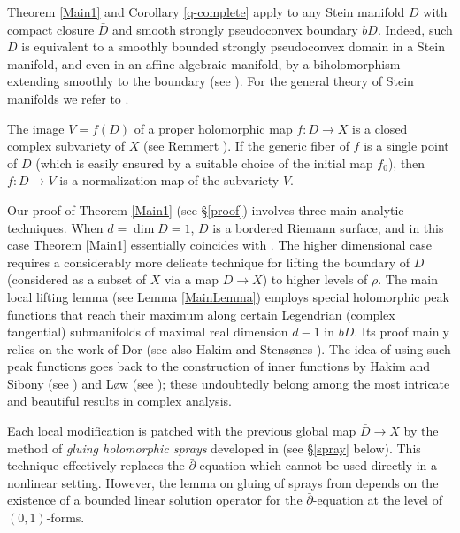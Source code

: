 \documentclass[11pt]{amsart}
\numberwithin{equation}{section}
\theoremstyle{definition}
\begin{document}
Theorem \ref{Main1} and Corollary \ref{q-complete} 
apply to any Stein manifold $D$ 
with compact closure $\bar D$ and smooth strongly 
pseudoconvex boundary $bD$. Indeed, such $D$ is equivalent to a smoothly 
bounded strongly pseudoconvex domain in a Stein manifold, and even in an 
affine algebraic manifold, by a biholomorphism extending smoothly to 
the boundary (see \cite{Catlin,Heunemann3,Stout}).
For the general theory of Stein manifolds we refer to \cite{GR,Ho}.

The image $V=f(D)$ of a proper holomorphic map $f\colon D\to X$ is 
a closed complex subvariety of $X$ (see Remmert \cite{Remmert2}). 
If the generic fiber of $f$ is a single point of $D$ (which is
easily ensured by a suitable choice of the initial map $f_0$),
then $f\colon D\to V$ is a normalization map of the subvariety $V$.  

Our proof of Theorem \ref{Main1} (see \S\ref{proof})
involves three main analytic techniques.
When $d=\dim D=1$, $D$ is a bordered Riemann surface, 
and in this case Theorem \ref{Main1} essentially
coincides with \cite[Theorem 1.1]{BDF1}. 
The higher dimensional case requires a considerably 
more delicate technique for lifting the boundary of $D$ 
(considered as a subset of $X$ via a map 
$\bar D \to X$) to higher levels of $\rho$.
The main local lifting lemma (see Lemma \ref{MainLemma}) 
employs special holomorphic peak functions that reach their maximum
along certain Legendrian (complex tangential) submanifolds of maximal
real dimension $d-1$ in $bD$. Its proof mainly relies on the 
work of Dor \cite{Dor1} (see also Hakim \cite{Hakim} and Stens\o nes \cite{Sten}).
The idea of using such peak functions goes back to the construction of inner
functions by Hakim and Sibony (see \cite{HakimSibony}) and 
L\o w (see \cite{Low1}); these undoubtedly belong among 
the most intricate and beautiful results in complex analysis.

Each local modification is patched with the previous global map
$\bar D\to X$ by the method of {\em gluing holomorphic sprays} 
developed in \cite{BDF1} (see \S\ref{spray} below).
This technique effectively replaces the ${\bar\partial}$-equation
which cannot be used directly in a nonlinear setting.
However, the lemma on gluing of sprays from \cite{BDF1}
depends on the existence of a bounded linear solution operator for
the ${\bar\partial}$-equation at the level of $(0,1)$-forms.
\end{document}

